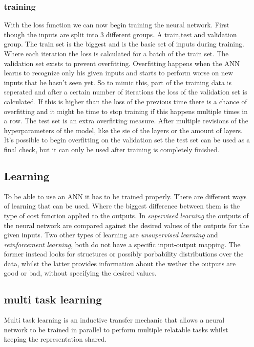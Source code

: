 \documentclass[a4paper]{article}
\begin{document}
\subsubsection{training}
With the loss function we can now begin training the neural network. First though the inputs are split into 3 different groups. A train,test and validation group. The train set is the biggest and is the basic set of inputs during training. Where each iteration the loss is calculated for a batch of the train set. The validation set exists to prevent overfitting. Overfitting happens when the ANN learns to recognize only his given inputs and starts to perform worse on new inputs that he hasn't seen yet. So to mimic this, part of the training data is seperated and after a certain number of iterations the loss of the validation set is calculated. If this is higher than the loss of the previous time there is a chance of overfitting and it might be time to stop training if this happens multiple times in a row. The test set is an extra overfitting measure. After multiple revisions of the hyperparameters of the model, like the sie of the layers or the amount of layers. It's possible to begin overfitting on the validation set the test set can be used as a final check, but it can only be used after training is completely finished.




 
\subsection{Learning}
To be able to use an ANN it has to be trained properly. There are different ways of learning that can be used. Where the biggest difference between them is the type of cost function applied to the outputs. In \textit{supervised learning} the outputs of the neural network are compared against the desired values of the outputs for the given inputs. Two other types of learning are \textit{unsupervised learning} and \textit{reinforcement learning}, both do not have a specific input-output mapping. The former instead looks for structures or possibly porbability distributions over the data, whilst the latter provides information about the wether the outputs are good or bad, without specifying the desired values.\cite{Bish}
\subsection{multi task learning}
Multi task learning is an inductive transfer mechanic that allows a neural network to be trained in parallel to perform multiple relatable tasks whilst keeping the representation shared.
\end{document}
